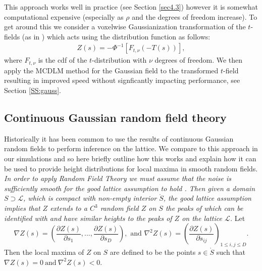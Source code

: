 \documentclass{article}
\newcommand{\nt}[1]{\textit{\color{red} #1}}
\begin{document}
This approach works well in practice (see Section \ref{sec4.3}) however it is somewhat computational expensive (especially as $\rho$ and the degrees of freedom increase). To get around this we consider a voxelwise Gaussianization transformation of the $t$-fields (as in \cite{schwartzman2019peak}) which acts using the distribution function as follows:
\begin{align}
    Z(s) = -\Phi^{-1}[F_{t,\nu}(-T(s))], \label{eqn.t2Gauss}
\end{align}
where $F_{t,\nu}$ is the cdf of the $t$-distribution with $\nu$ degrees of freedom. We then apply the MCDLM method for the Gaussian field to the transformed $t$-field resulting in improved speed without signficantly impacting performance, see Section \ref{SS:gauss}.


\subsection{Continuous Gaussian random field theory} \label{sec2.3}
Historically \citep{chumbley2009false, chumbley2010topological,schwartzman2019peak} it has been common to use the results of continuous Gaussian random fields \citep{adler1981geometry} to perform inference on the lattice. We compare to this approach in our simulations and so here briefly outline how this works and explain how it can be used to provide height distributions for local maxima in smooth random fields. \nt{In order to apply Random Field Theory we must assume that the noise is sufficiently smooth for the good lattice assumption to hold \citep{davenport2023robust}. Then given a domain $S \supset \mathcal{L}$, which is compact with non-empty interior $\mathring{S}$, the good lattice assumption implies that $Z$ extends to a $C^3$ random field $Z$ on $S$ the peaks of which can be identified with and have similar heights to the peaks of $Z$ on the lattice $\mathcal{L}$.} Let 
\begin{equation*}
	\nabla{Z(s)} = \left(\frac{\partial{Z(s)}}{\partial{s_1}},...,\frac{\partial{Z(s)}}{\partial{s_D}}\right), \text{ and }
	\nabla^2{Z(s)} = \left(\frac{\partial{Z(s)}}{\partial{s_{ij}}}\right)_{1\leq i,j\leq D}.
\end{equation*}
Then the local maxima of $Z$ on $S$ are defined to be the points $s\in \mathring{S}$ such that $\nabla{Z}(s) = 0\ \text{and}\ \nabla^2{Z}(s)<0$.
\end{document}
